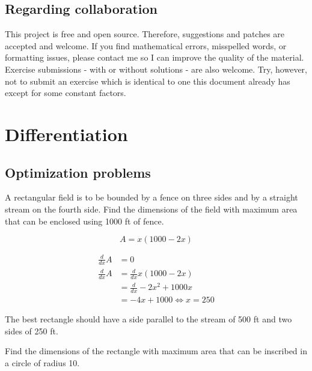 \documentclass[a4paper, titlepage]{article}
\begin{document}
\subsection{Regarding collaboration}

This project is free and open source. Therefore, suggestions and patches are
accepted and welcome. If you find mathematical errors, misspelled words, or
formatting issues, please contact me so I can improve the quality of the
material. Exercise submissions - with or without solutions - are also welcome.
Try, however, not to submit an exercise which is identical to one this document
already has except for some constant factors.

\section{Differentiation}

\subsection{Optimization problems}

\begin{Exercise}
A rectangular field is to be bounded by a fence on three sides
and by a straight stream on the fourth side.
Find the dimensions of the field with maximum area that can be enclosed
using 1000 ft of fence.
\cite{anton-bivens-davis}
\end{Exercise}

\begin{Answer}
\[A = x \left( 1000 - 2x \right)\]

\begin{align*}
    \frac{d}{dx} A &= 0 \\
    \frac{d}{dx} A &= \frac{d}{dx} x \left( 1000 - 2x \right) \\
    &= \frac{d}{dx} -2x^2 + 1000x \\
    &= -4x + 1000
    \iff x = 250
\end{align*}

The best rectangle should have a side parallel to the stream of 500 ft
and two sides of 250 ft.
\end{Answer}

\begin{Exercise}
Find the dimensions of the rectangle with maximum area
that can be inscribed in a circle of radius 10.
\cite{anton-bivens-davis}
\end{Exercise}
\end{document}
